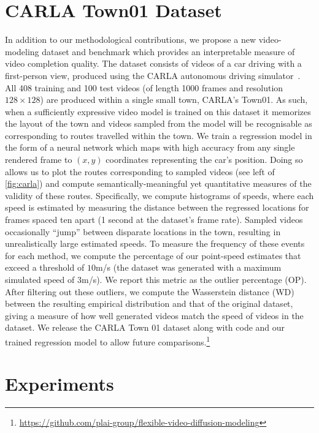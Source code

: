 \section{CARLA Town01 Dataset}
\label{sec:carla}
In addition to our methodological contributions, we propose a new video-modeling dataset and benchmark which provides an interpretable measure of video completion quality. The dataset consists of videos of a car driving with a first-person view, produced using the CARLA autonomous driving simulator~\cite{dosovitskiy2017carla}.
All 408 training and 100 test videos (of length 1000 frames and resolution $128\times128$) are produced within a single small town, CARLA's Town01. As such, when a sufficiently expressive video model is trained on this dataset it memorizes the layout of the town and videos sampled from the model will be recognisable as corresponding to routes travelled within the town. We train a regression model in the form of a neural network which maps with high accuracy from any single rendered frame to $(x,y)$ coordinates representing the car's position. Doing so allows us to plot the routes corresponding to sampled videos (see left of \cref{fig:carla}) and compute semantically-meaningful yet quantitative measures of the validity of these routes. Specifically, we compute histograms of speeds, where each speed is estimated by measuring the distance between the regressed locations for frames spaced ten apart (1 second at the dataset's frame rate). Sampled videos occasionally ``jump'' between disparate locations in the town, resulting in unrealistically large estimated speeds. To measure the frequency of these events for each method, we compute the percentage of our point-speed estimates that exceed a threshold of $10$m/s (the dataset was generated with a maximum simulated speed of $3$m/s). We report this metric as the outlier percentage (OP). After filtering out these outliers, we compute the Wasserstein distance (WD) between the resulting empirical distribution and that of the original dataset, giving a measure of how well generated videos match the speed of videos in the dataset. We release the CARLA Town 01 dataset along with code and our trained regression model to allow future comparisons.\footnote{\url{https://github.com/plai-group/flexible-video-diffusion-modeling}}

\section{Experiments} \label{sec:experiments}




